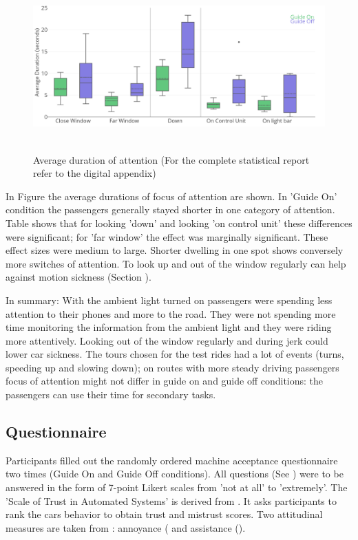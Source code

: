 \begin{figure}
    \includegraphics[width=1\textwidth]{fig/Average.png}\hfill\
    \caption[Average Duration of Attention]{Average duration of attention (For the complete statistical report refer to the digital appendix)}
    \label{fig:attentionAverage}
\end{figure}


In Figure  the average durations of focus of attention are shown. In 'Guide On' condition the passengers generally stayed shorter in one category of attention. Table  shows that for looking 'down' and looking 'on control unit' these differences were significant; for 'far window' the effect was marginally significant. These effect sizes were medium to large. Shorter dwelling in one spot shows conversely more switches of attention. To look up and out of the window regularly can help against motion sickness (Section ). 

In summary: With the ambient light turned on passengers were spending less attention to their phones and more to the road. They were not spending more time monitoring the information from the ambient light and they were riding more attentively. Looking out of the window regularly and during jerk could lower car sickness. The tours chosen for the test rides had a lot of events (turns, speeding up and slowing down); on routes with more steady driving passengers focus of attention might not differ in guide on and guide off conditions: the passengers can use their time for secondary tasks. 

\subsection{Questionnaire}
\label{ssec:questionaire}
Participants filled out the randomly ordered machine acceptance questionnaire two times (Guide On and Guide Off conditions). All questions (See  ) were to be answered in the form of 7-point Likert scales from 'not at all' to 'extremely'. The 'Scale of Trust in Automated Systems' is derived from \cite{Jian2010}. It asks participants to rank the cars behavior to obtain trust and mistrust scores. Two attitudinal measures are taken from \cite{Koo2015}: annoyance ( and assistance (). 

